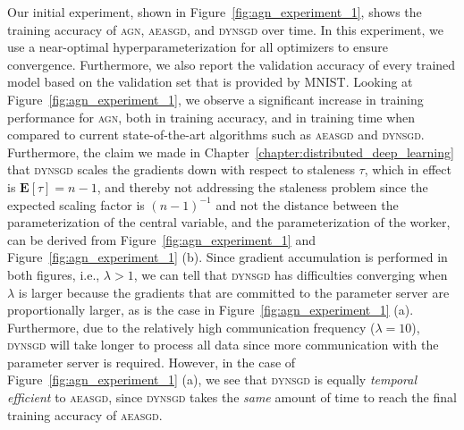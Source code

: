 Our initial experiment, shown in Figure~\ref{fig:agn_experiment_1}, shows the training accuracy of \textsc{agn}, \textsc{aeasgd}, and \textsc{dynsgd} over time. In this experiment, we use a near-optimal hyperparameterization for all optimizers to ensure convergence. Furthermore, we also report the validation accuracy of every trained model based on the validation set that is provided by MNIST. Looking at Figure~\ref{fig:agn_experiment_1}, we observe a significant increase in training performance for \textsc{agn}, both in training accuracy, and in training time when compared to current state-of-the-art algorithms such as \textsc{aeasgd} and \textsc{dynsgd}. Furthermore, the claim we made in Chapter~\ref{chapter:distributed_deep_learning} that \textsc{dynsgd} scales the gradients down with respect to staleness $\tau$, which in effect is $\textbf{E}[\tau] = n - 1$, and thereby not addressing the staleness problem since the expected scaling factor is $(n - 1)^{-1}$ and not the distance between the parameterization of the central variable, and the parameterization of the worker, can be derived from Figure~\ref{fig:agn_experiment_1} and Figure~\ref{fig:agn_experiment_1} (b). Since gradient accumulation is performed in both figures, i.e., $\lambda > 1$, we can tell that \textsc{dynsgd} has difficulties converging when $\lambda$ is larger because the gradients that are committed to the parameter server are proportionally larger, as is the case in Figure~\ref{fig:agn_experiment_1} (a). Furthermore, due to the relatively high communication frequency ($\lambda = 10$), \textsc{dynsgd} will take longer to process all data since more communication with the parameter server is required. However, in the case of Figure~\ref{fig:agn_experiment_1} (a), we see that \textsc{dynsgd} is equally \emph{temporal efficient} to \textsc{aeasgd}, since \textsc{dynsgd} takes the \emph{same} amount of time to reach the final training accuracy of \textsc{aeasgd}.

